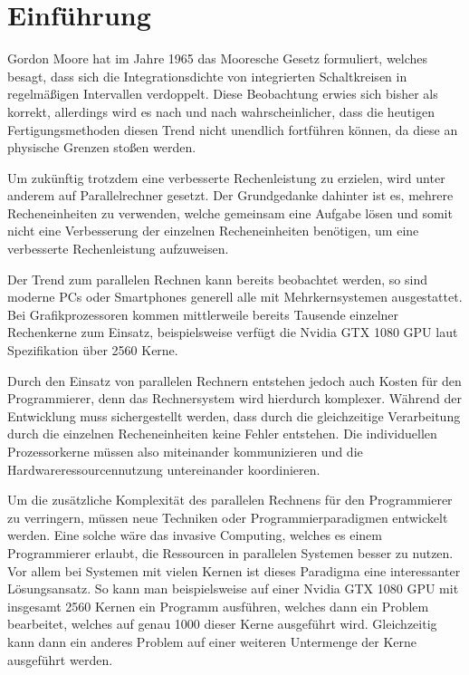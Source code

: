 \chapter{Einführung}\label{sec:intro}

Gordon Moore hat im Jahre 1965 das Mooresche Gesetz formuliert, welches besagt, dass sich die Integrationsdichte
von integrierten Schaltkreisen in regelmäßigen Intervallen verdoppelt\cite{mooresLawPastPresentFuture}.
Diese Beobachtung erwies sich bisher als korrekt, allerdings wird es nach und nach wahrscheinlicher,
dass die heutigen Fertigungsmethoden diesen Trend nicht unendlich fortführen können, da diese an
physische Grenzen stoßen werden.\cite{endOfMooresLaw}

Um zukünftig trotzdem eine verbesserte Rechenleistung zu erzielen, wird unter anderem auf Parallelrechner gesetzt.
Der Grundgedanke dahinter ist es, mehrere Recheneinheiten zu verwenden, welche gemeinsam eine Aufgabe
lösen und somit nicht eine Verbesserung der einzelnen Recheneinheiten benötigen, um eine verbesserte Rechenleistung
aufzuweisen.

Der Trend zum parallelen Rechnen kann bereits beobachtet werden,
so sind moderne PCs oder Smartphones generell alle mit Mehrkernsystemen ausgestattet.
Bei Grafikprozessoren kommen mittlerweile bereits Tausende einzelner Rechenkerne zum Einsatz,
beispielsweise verfügt die Nvidia GTX 1080 GPU laut Spezifikation \cite{nvidia1080specs} über 2560 Kerne.

Durch den Einsatz von parallelen Rechnern entstehen jedoch auch Kosten für den Programmierer,
denn das Rechnersystem wird hierdurch komplexer.
Während der Entwicklung muss sichergestellt werden, dass durch die gleichzeitige Verarbeitung durch die einzelnen
Recheneinheiten keine Fehler entstehen. Die individuellen Prozessorkerne müssen also miteinander
kommunizieren und die Hardwareressourcennutzung untereinander koordinieren.

Um die zusätzliche Komplexität des parallelen Rechnens für den Programmierer zu verringern,
müssen neue Techniken oder Programmierparadigmen entwickelt werden.
Eine solche wäre das invasive Computing, welches es einem Programmierer erlaubt,
die Ressourcen in parallelen Systemen besser zu nutzen.
Vor allem bei Systemen mit vielen Kernen ist dieses Paradigma eine interessanter Lösungsansatz.
So kann man beispielsweise auf einer Nvidia GTX 1080 GPU mit insgesamt 2560 Kernen ein Programm
ausführen, welches dann ein Problem bearbeitet, welches auf genau 1000 dieser Kerne ausgeführt wird.
Gleichzeitig kann dann ein anderes Problem auf einer weiteren Untermenge der Kerne ausgeführt werden.

